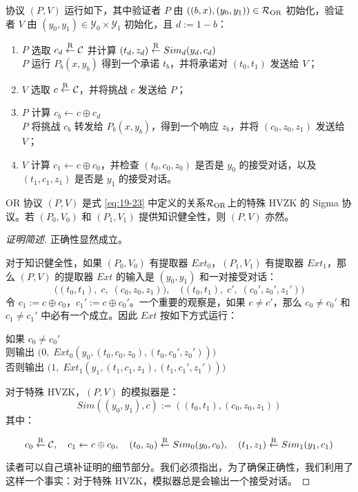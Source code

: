 协议 $(P,V)$ 运行如下，其中验证者 $P$ 由 $((b,x),(y_0,y_1))\in\mathcal{R}_{\rm OR}$ 初始化，验证者 $V$ 由 $(y_0,y_1)\in\mathcal{Y}_0\times\mathcal{Y}_1$ 初始化，且 $d:=1-b$：
\begin{enumerate}
	\item $P$ 选取 $c_d\overset{\rm R}\leftarrow\mathcal{C}$ 并计算 $(t_d,z_d)\overset{\rm R}\leftarrow Sim_d(y_d,c_d)$\\$P$ 运行 $P_b(x,y_b)$ 得到一个承诺 $t_b$，并将承诺对 $(t_0,t_1)$ 发送给 $V$；
	\item $V$ 选取 $c\overset{\rm R}\leftarrow\mathcal{C}$，并将挑战 $c$ 发送给 $P$；
	\item $P$ 计算 $c_b\leftarrow c\oplus c_d$\\$P$ 将挑战 $c_b$ 转发给 $P_b(x,y_b)$，得到一个响应 $z_b$，并将 $(c_0,z_0,z_1)$ 发送给 $V$；
	\item $V$ 计算 $c_1\leftarrow c\oplus c_0$，并检查 $(t_0,c_0,z_0)$ 是否是 $y_0$ 的接受对话，以及 $(t_1,c_1,z_1)$ 是否是 $y_1$ 的接受对话。
\end{enumerate}

\begin{theorem}
OR 协议 $(P,V)$ 是式 \ref{eq:19-23} 中定义的关系$\mathcal{R}_{\rm OR}$上的特殊 HVZK 的 Sigma 协议。若 $(P_0,V_0)$ 和 $(P_1,V_1)$ 提供知识健全性，则 $(P, V)$ 亦然。
\end{theorem}

\begin{proof}[证明简述]
正确性显然成立。

对于知识健全性，如果 $(P_0,V_0)$ 有提取器 $Ext_0$，$(P_1,V_1)$ 有提取器 $Ext_1$，那么 $(P, V)$ 的提取器 $Ext$ 的输入是 $(y_0,y_1)$ 和一对接受对话：
\[
\big((t_0,t_1),\;c,\;(c_0,z_0,z_1)\big),
\quad
\big((t_0,t_1),\;c',\;(c_0',z_0',z_1')\big)
\]
令 $c_1:=c\oplus c_0$，$c_1':=c\oplus c_0'$。一个重要的观察是，如果 $c\neq c'$，那么 $c_0\neq c_0'$ 和 $c_1\neq c_1'$ 中必有一个成立。因此 $Ext$ 按如下方式运行：

\vspace{8pt}

\hspace*{30pt} 如果 $c_0\neq c_0'$\\
\hspace*{90pt} 则输出 $\Big(0,\;Ext_0(y_0,(t_0,c_0,z_0),(t_0,c_0',z_0'))\Big)$\\
\hspace*{90pt} 否则输出 $\Big(1,\;Ext_1(y_1,(t_1,c_1,z_1),(t_1,c_1',z_1'))\Big)$

\vspace{8pt}

对于特殊 HVZK，$(P, V)$ 的模拟器是：
\[
Sim((y_0,y_1),c):=((t_0,t_1),(c_0,z_0,z_1))
\]
其中：

\[
c_0\overset{\rm R}\leftarrow\mathcal{C},
\quad
c_1\leftarrow c\oplus c_0,
\quad
(t_0,z_0)\overset{\rm R}\leftarrow Sim_0(y_0,c_0),
\quad
(t_1,z_1)\overset{\rm R}\leftarrow Sim_1(y_1,c_1)
\]

读者可以自己填补证明的细节部分。我们必须指出，为了确保正确性，我们利用了这样一个事实：对于特殊 HVZK，模拟器总是会输出一个接受对话。
\end{proof}